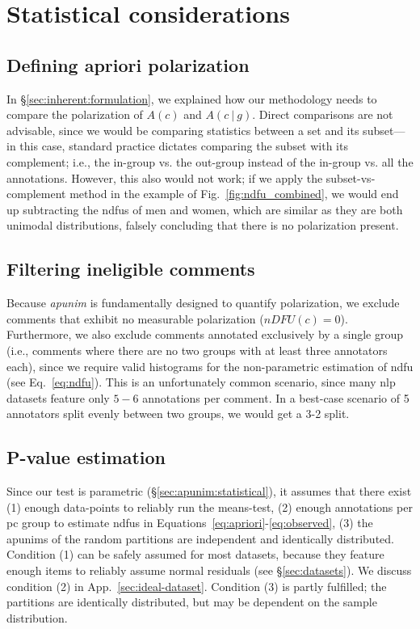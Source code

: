 \documentclass{article} %
\theoremstyle{definition}
\theoremstyle{plain}
\newcommand\given[1][]{\:#1\vert\:}
\begin{document}
\section{Statistical considerations}
\label{app:stats}

\subsection{Defining apriori polarization}
\label{app:stats:comparison}

In \S\ref{sec:inherent:formulation}, we explained how our methodology needs to compare the polarization of $A(c)$ and $A(c \given g)$. Direct comparisons are not advisable, since we would be comparing statistics between a set and its subset---in this case, standard practice dictates comparing the subset with its complement; i.e., the in-group vs. the out-group instead of the in-group vs. all the annotations. However, this also would not work; if we apply the subset-vs-complement method in the example of Fig.~\ref{fig:ndfu_combined}, we would end up subtracting the \acp{ndfu} of men and women, which are similar as they are both unimodal distributions, falsely concluding that there is no polarization present.


\subsection{Filtering ineligible comments}
\label{app:stats:filtering}

Because \textit{apunim} is fundamentally designed to quantify polarization, we exclude comments that exhibit no measurable polarization ($nDFU(c)=0$). Furthermore, we also exclude comments annotated exclusively by a single group (i.e., comments where there are no two groups with at least three annotators each), since we require valid histograms for the non-parametric estimation of \ac{ndfu} (see Eq.~\ref{eq:ndfu}). This is an unfortunately common scenario, since many \ac{nlp} datasets feature only $5-6$ annotations per comment. In a best-case scenario of 5 annotators split evenly between two groups, we would get a 3-2 split.


\subsection{P-value estimation}
\label{app:stats:pvalue}

Since our test is parametric (\S\ref{sec:apunim:statistical}), it assumes that there exist (1) enough data-points to reliably run the means-test, (2) enough annotations per \ac{pc} group to estimate \acp{ndfu} in Equations~\ref{eq:apriori}-\ref{eq:observed}, (3) the apunims of the random partitions are independent and identically distributed. Condition (1) can be safely assumed for most datasets, because they feature enough items to reliably assume normal residuals (see \S\ref{sec:datasets}). We discuss condition (2) in App.~\ref{sec:ideal-dataset}. Condition (3) is partly fulfilled; the partitions are identically distributed, but may be dependent on the sample distribution. 
\end{document}
